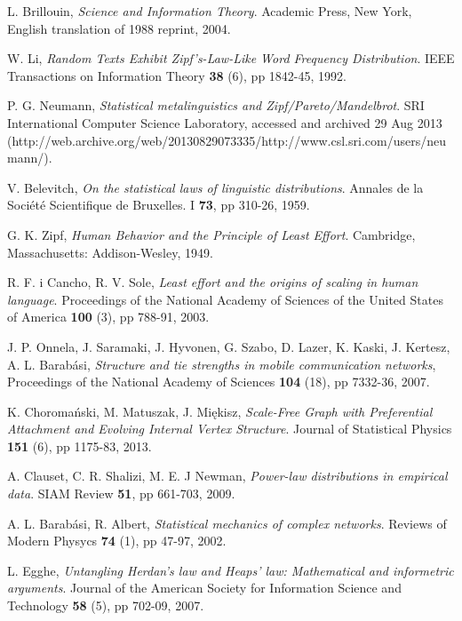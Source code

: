 \begin{thebibliography}{99}
  L. Brillouin,
  \emph{Science and Information Theory}.
  Academic Press, New York,
  English translation of 1988 reprint,
  2004.

  W. Li,
  \emph{Random Texts Exhibit Zipf's-Law-Like Word Frequency Distribution}.
  IEEE Transactions on Information Theory \textbf{38} (6), pp 1842-45,
  1992.

  P. G. Neumann,
  \emph{Statistical metalinguistics and Zipf/Pareto/Mandelbrot}.
  SRI International Computer Science Laboratory,
  accessed and archived 29 Aug 2013 (http://web.archive.org/web/20130829073335/http://www.csl.sri.com/users/neumann/).

  V. Belevitch,
  \emph{On the statistical laws of linguistic distributions}.
  Annales de la Société Scientifique de Bruxelles. I \textbf{73}, pp 310-26,
  1959.

  G. K. Zipf,
  \emph{Human Behavior and the Principle of Least Effort}.
  Cambridge, Massachusetts: Addison-Wesley,
  1949.

  R. F. i Cancho, R. V. Sole,
  \emph{Least effort and the origins of scaling in human language}.
  Proceedings of the National Academy of Sciences of the United States of America \textbf{100} (3), pp 788-91,
  2003.

  J. P. Onnela, J. Saramaki, J. Hyvonen, G. Szabo, D. Lazer, K. Kaski, J. Kertesz, A. L. Barabási,
  \emph{Structure and tie strengths in mobile communication networks},
  Proceedings of the National Academy of Sciences \textbf{104} (18), pp 7332-36,
  2007.

  K. Choromański, M. Matuszak, J. Miękisz,
  \emph{Scale-Free Graph with Preferential Attachment and Evolving Internal Vertex Structure}.
  Journal of Statistical Physics \textbf{151} (6), pp 1175-83,
  2013.

  A. Clauset, C. R. Shalizi, M. E. J Newman,
  \emph{Power-law distributions in empirical data}.
  SIAM Review \textbf{51}, pp 661-703,
  2009.

  A. L. Barabási, R. Albert,
  \emph{Statistical mechanics of complex networks}.
  Reviews of Modern Physycs \textbf{74} (1), pp 47-97,
  2002.

  L. Egghe,
  \emph{Untangling Herdan's law and Heaps' law: Mathematical and informetric arguments}.
  Journal of the American Society for Information Science and Technology \textbf{58} (5), pp 702-09,
  2007.


\end{thebibliography}
